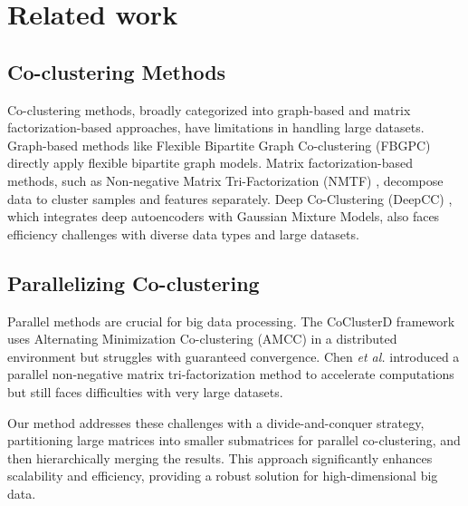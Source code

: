 
\section{Related work}
\label{sec:related_work}
\subsection{Co-clustering Methods}
Co-clustering methods, broadly categorized into graph-based and matrix factorization-based approaches, have limitations in handling large datasets. Graph-based methods like Flexible Bipartite Graph Co-clustering (FBGPC) \cite{chen2023FastFlexibleBipartitea} directly apply flexible bipartite graph models. Matrix factorization-based methods, such as Non-negative Matrix Tri-Factorization (NMTF) \cite{long2005CoclusteringBlockValue}, decompose data to cluster samples and features separately. Deep Co-Clustering (DeepCC) \cite{dongkuanxu2019DeepCoClustering}, which integrates deep autoencoders with Gaussian Mixture Models, also faces efficiency challenges with diverse data types and large datasets.

\subsection{Parallelizing Co-clustering}
Parallel methods are crucial for big data processing. The CoClusterD framework \cite{cheng2015CoClusterDDistributedFramework} uses Alternating Minimization Co-clustering (AMCC) in a distributed environment but struggles with guaranteed convergence. Chen \textit{et al.} \cite{chen2023ParallelNonNegativeMatrix} introduced a parallel non-negative matrix tri-factorization method to accelerate computations but still faces difficulties with very large datasets.

Our method addresses these challenges with a divide-and-conquer strategy, partitioning large matrices into smaller submatrices for parallel co-clustering, and then hierarchically merging the results. This approach significantly enhances scalability and efficiency, providing a robust solution for high-dimensional big data.

